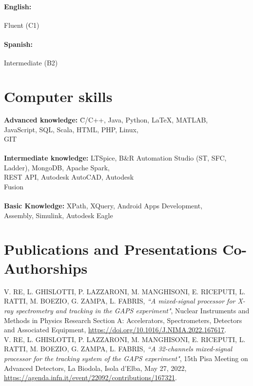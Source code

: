 \documentclass[11pt]{article}
\begin{document}
\paragraph{\hspace{2pt}English:} Fluent (C1)
\vspace{-0.5cm}
\paragraph{Spanish:} Intermediate (B2)

\bigskip
\section*{Computer skills}
\begin{tabbing}
\textbf{\hspace{16pt}Advanced knowledge: } \= C/C++, Java, Python, \LaTeX, MATLAB, \\ \>JavaScript, SQL, Scala, HTML, PHP, Linux, \\ \> GIT\\\\
\textbf{Intermediate knowledge: } LTSpice, B\&R Automation Studio (ST, SFC,\\ \> Ladder), MongoDB, Apache Spark, \\ \> REST API, Autodesk AutoCAD, Autodesk \\ \> Fusion \\\\
\textbf{\hspace{35pt}Basic Knowledge: } XPath, XQuery, Android Apps Development, \\ \>Assembly, Simulink, Autodesk Eagle
\end{tabbing}

\bigskip
\section*{Publications and Presentations Co-Authorships}

\noindent
V. RE, L. GHISLOTTI, P. LAZZARONI, M. MANGHISONI, E. RICEPUTI, L. RATTI, M. BOEZIO, G. ZAMPA, L. FABRIS, \textit{``A mixed-signal processor for X-ray spectrometry and tracking in the GAPS experiment"}, Nuclear Instruments and Methods in Physics Research Section A: Accelerators, Spectrometers, Detectors and Associated Equipment, \href{https://doi.org/10.1016/J.NIMA.2022.167617}{https://doi.org/10.1016/J.NIMA.2022.167617}. \\

\noindent
V. RE, L. GHISLOTTI, P. LAZZARONI, M. MANGHISONI, E. RICEPUTI, L. RATTI, M. BOEZIO, G. ZAMPA, L. FABRIS, \textit{``A 32-channels mixed-signal processor for the tracking system of the GAPS experiment"}, 15th Pisa Meeting on Advanced Detectors, La Biodola, Isola d'Elba, May 27, 2022, \href{https://agenda.infn.it/event/22092/contributions/167321/attachments/91411/124353/Re_Elba_2022.pdf}{https://agenda.infn.it/event/22092/contributions/167321}.\\
\end{document}

